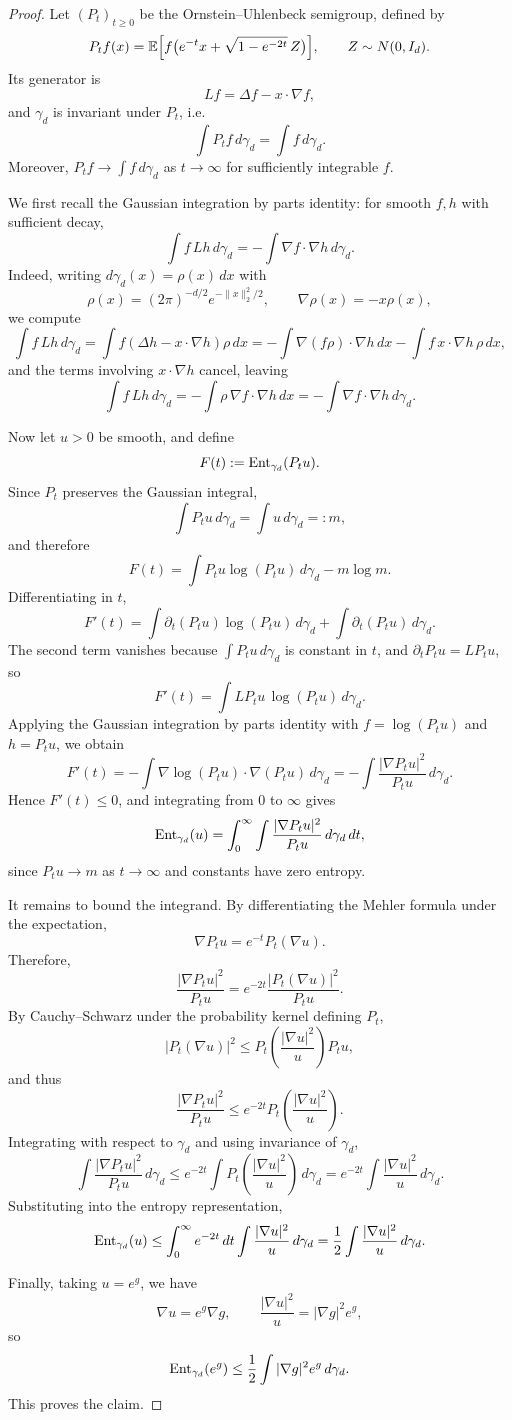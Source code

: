 \begin{proof}
Let $(P_t)_{t\ge 0}$ be the Ornstein--Uhlenbeck semigroup, defined by
\[
P_t f(x)
=
\mathbb{E}\Bigl[f\bigl(e^{-t}x+\sqrt{1-e^{-2t}}\,Z\bigr)\Bigr],
\qquad Z\sim N(0,I_d).
\]
Its generator is
\[
Lf=\Delta f-x\cdot \nabla f,
\]
and $\gamma_d$ is invariant under $P_t$, i.e.
\[
\int P_t f\,d\gamma_d=\int f\,d\gamma_d.
\]
Moreover, $P_t f\to \int f\,d\gamma_d$ as $t\to\infty$ for sufficiently integrable $f$.

We first recall the Gaussian integration by parts identity:
for smooth $f,h$ with sufficient decay,
\[
\int f\,Lh\,d\gamma_d
=
-\int \nabla f\cdot \nabla h\,d\gamma_d.
\]
Indeed, writing $d\gamma_d(x)=\rho(x)\,dx$ with
\[
\rho(x)=(2\pi)^{-d/2}e^{-\|x\|_2^2/2},
\qquad \nabla \rho(x)=-x\rho(x),
\]
we compute
\[
\int f\,Lh\,d\gamma_d
=
\int f(\Delta h-x\cdot \nabla h)\rho\,dx
=
-\int \nabla(f\rho)\cdot \nabla h\,dx-\int f\,x\cdot \nabla h\,\rho\,dx,
\]
and the terms involving $x\cdot \nabla h$ cancel, leaving
\[
\int f\,Lh\,d\gamma_d
=
-\int \rho\,\nabla f\cdot \nabla h\,dx
=
-\int \nabla f\cdot \nabla h\,d\gamma_d.
\]

Now let $u>0$ be smooth, and define
\[
F(t):=\operatorname{Ent}_{\gamma_d}(P_tu).
\]
Since $P_t$ preserves the Gaussian integral,
\[
\int P_tu\,d\gamma_d=\int u\,d\gamma_d=:m,
\]
and therefore
\[
F(t)=\int P_tu\log(P_tu)\,d\gamma_d-m\log m.
\]
Differentiating in $t$,
\[
F'(t)
=
\int \partial_t(P_tu)\log(P_tu)\,d\gamma_d
+
\int \partial_t(P_tu)\,d\gamma_d.
\]
The second term vanishes because $\int P_tu\,d\gamma_d$ is constant in $t$, and
$\partial_t P_tu=LP_tu$, so
\[
F'(t)=\int LP_tu\,\log(P_tu)\,d\gamma_d.
\]
Applying the Gaussian integration by parts identity with
$f=\log(P_tu)$ and $h=P_tu$, we obtain
\[
F'(t)
=
-\int \nabla \log(P_tu)\cdot \nabla(P_tu)\,d\gamma_d
=
-\int \frac{|\nabla P_tu|^2}{P_tu}\,d\gamma_d.
\]
Hence $F'(t)\le 0$, and integrating from $0$ to $\infty$ gives
\[
\operatorname{Ent}_{\gamma_d}(u)
=
\int_0^\infty \int \frac{|\nabla P_tu|^2}{P_tu}\,d\gamma_d\,dt,
\]
since $P_tu\to m$ as $t\to\infty$ and constants have zero entropy.

It remains to bound the integrand. By differentiating the Mehler formula under the expectation,
\[
\nabla P_tu = e^{-t}P_t(\nabla u).
\]
Therefore,
\[
\frac{|\nabla P_tu|^2}{P_tu}
=
e^{-2t}\frac{|P_t(\nabla u)|^2}{P_tu}.
\]
By Cauchy--Schwarz under the probability kernel defining $P_t$,
\[
|P_t(\nabla u)|^2
\le
P_t\!\left(\frac{|\nabla u|^2}{u}\right)P_tu,
\]
and thus
\[
\frac{|\nabla P_tu|^2}{P_tu}
\le
e^{-2t}P_t\!\left(\frac{|\nabla u|^2}{u}\right).
\]
Integrating with respect to $\gamma_d$ and using invariance of $\gamma_d$,
\[
\int \frac{|\nabla P_tu|^2}{P_tu}\,d\gamma_d
\le
e^{-2t}\int P_t\!\left(\frac{|\nabla u|^2}{u}\right)\,d\gamma_d
=
e^{-2t}\int \frac{|\nabla u|^2}{u}\,d\gamma_d.
\]
Substituting into the entropy representation,
\[
\operatorname{Ent}_{\gamma_d}(u)
\le
\int_0^\infty e^{-2t}\,dt
\int \frac{|\nabla u|^2}{u}\,d\gamma_d
=
\frac12\int \frac{|\nabla u|^2}{u}\,d\gamma_d.
\]

Finally, taking $u=e^g$, we have
\[
\nabla u=e^g\nabla g,
\qquad
\frac{|\nabla u|^2}{u}=|\nabla g|^2e^g,
\]
so
\[
\operatorname{Ent}_{\gamma_d}(e^g)\le \frac12\int |\nabla g|^2e^g\,d\gamma_d.
\]
This proves the claim.
\end{proof}

